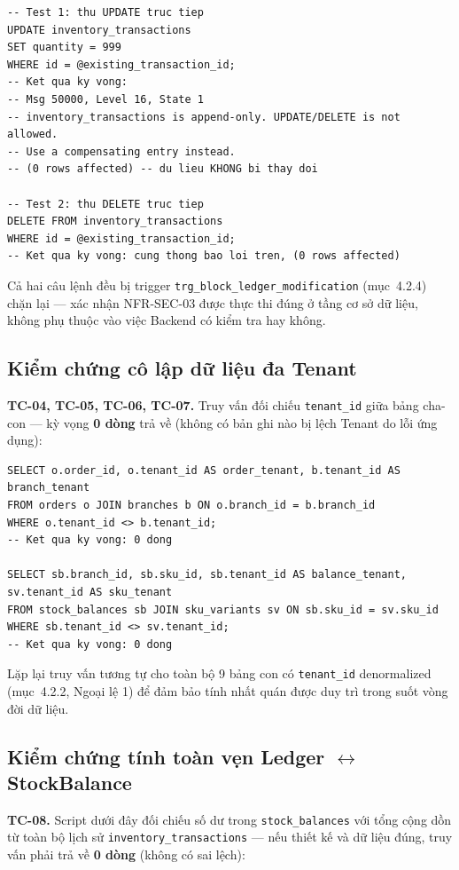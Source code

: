 \begin{lstlisting}
-- Test 1: thu UPDATE truc tiep
UPDATE inventory_transactions
SET quantity = 999
WHERE id = @existing_transaction_id;
-- Ket qua ky vong:
-- Msg 50000, Level 16, State 1
-- inventory_transactions is append-only. UPDATE/DELETE is not allowed.
-- Use a compensating entry instead.
-- (0 rows affected) -- du lieu KHONG bi thay doi

-- Test 2: thu DELETE truc tiep
DELETE FROM inventory_transactions
WHERE id = @existing_transaction_id;
-- Ket qua ky vong: cung thong bao loi tren, (0 rows affected)
\end{lstlisting}

Cả hai câu lệnh đều bị trigger \texttt{trg\_block\_ledger\_modification} (mục~4.2.4) chặn lại — xác nhận NFR-SEC-03 được thực thi đúng ở tầng cơ sở dữ liệu, không phụ thuộc vào việc Backend có kiểm tra hay không.

\subsection{Kiểm chứng cô lập dữ liệu đa Tenant}
\textbf{TC-04, TC-05, TC-06, TC-07.} Truy vấn đối chiếu \texttt{tenant\_id} giữa bảng cha-con — kỳ vọng \textbf{0 dòng} trả về (không có bản ghi nào bị lệch Tenant do lỗi ứng dụng):
\begin{lstlisting}
SELECT o.order_id, o.tenant_id AS order_tenant, b.tenant_id AS branch_tenant
FROM orders o JOIN branches b ON o.branch_id = b.branch_id
WHERE o.tenant_id <> b.tenant_id;
-- Ket qua ky vong: 0 dong

SELECT sb.branch_id, sb.sku_id, sb.tenant_id AS balance_tenant, sv.tenant_id AS sku_tenant
FROM stock_balances sb JOIN sku_variants sv ON sb.sku_id = sv.sku_id
WHERE sb.tenant_id <> sv.tenant_id;
-- Ket qua ky vong: 0 dong
\end{lstlisting}
Lặp lại truy vấn tương tự cho toàn bộ 9 bảng con có \texttt{tenant\_id} denormalized (mục~4.2.2, Ngoại lệ 1) để đảm bảo tính nhất quán được duy trì trong suốt vòng đời dữ liệu.


\subsection{\texorpdfstring{Kiểm chứng tính toàn vẹn Ledger $\leftrightarrow$ StockBalance}{Kiểm chứng tính toàn vẹn Ledger <-> StockBalance}}
\textbf{TC-08.} Script dưới đây đối chiếu số dư trong \texttt{stock\_balances} với tổng cộng dồn từ toàn bộ lịch sử \texttt{inventory\_transactions} — nếu thiết kế và dữ liệu đúng, truy vấn phải trả về \textbf{0 dòng} (không có sai lệch):

